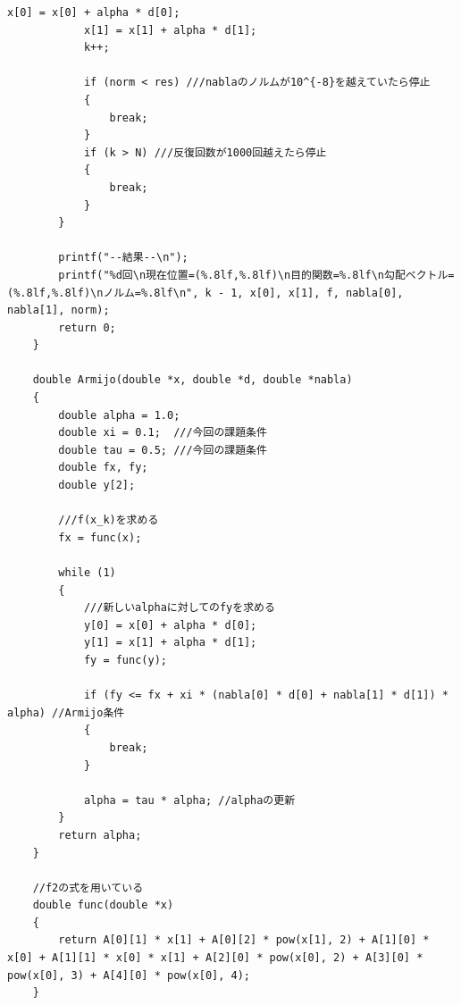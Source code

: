 \documentclass[12pt]{jarticle}
\begin{document}
\begin{lstlisting}[style = lstcpp,caption=4619055\_辰川力駆\_SD\_2.c]
            x[0] = x[0] + alpha * d[0];
            x[1] = x[1] + alpha * d[1];
            k++;
    
            if (norm < res) ///nablaのノルムが10^{-8}を越えていたら停止
            {
                break;
            }
            if (k > N) ///反復回数が1000回越えたら停止
            {
                break;
            }
        }
    
        printf("--結果--\n");
        printf("%d回\n現在位置=(%.8lf,%.8lf)\n目的関数=%.8lf\n勾配ベクトル=(%.8lf,%.8lf)\nノルム=%.8lf\n", k - 1, x[0], x[1], f, nabla[0], nabla[1], norm);
        return 0;
    }
    
    double Armijo(double *x, double *d, double *nabla)
    {
        double alpha = 1.0;
        double xi = 0.1;  ///今回の課題条件
        double tau = 0.5; ///今回の課題条件
        double fx, fy;
        double y[2];
    
        ///f(x_k)を求める
        fx = func(x);
    
        while (1)
        {
            ///新しいalphaに対してのfyを求める
            y[0] = x[0] + alpha * d[0];
            y[1] = x[1] + alpha * d[1];
            fy = func(y);
    
            if (fy <= fx + xi * (nabla[0] * d[0] + nabla[1] * d[1]) * alpha) //Armijo条件
            {
                break;
            }
    
            alpha = tau * alpha; //alphaの更新
        }
        return alpha;
    }
    
    //f2の式を用いている
    double func(double *x)
    {
        return A[0][1] * x[1] + A[0][2] * pow(x[1], 2) + A[1][0] * x[0] + A[1][1] * x[0] * x[1] + A[2][0] * pow(x[0], 2) + A[3][0] * pow(x[0], 3) + A[4][0] * pow(x[0], 4);
    }
\end{lstlisting}
\end{document}
